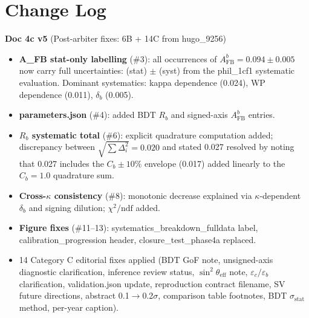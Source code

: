 \documentclass[11pt,a4paper]{article}
\begin{document}
\tableofcontents
\clearpage

\section*{Change Log}

\textbf{Doc 4c v5} (Post-arbiter fixes: 6B + 14C from hugo\_9256)
\begin{itemize}
\item \textbf{A\_FB stat-only labelling} (\#3): all occurrences of $A_\text{FB}^b = 0.094 \pm 0.005$
  now carry full uncertainties: (stat) $\pm$ (syst) from the phil\_1cf1 systematic evaluation.
  Dominant systematics: kappa dependence (0.024), WP dependence (0.011), $\delta_b$ (0.005).
\item \textbf{parameters.json} (\#4): added BDT $R_b$ and signed-axis $A_\text{FB}^b$ entries.
\item \textbf{$R_b$ systematic total} (\#6): explicit quadrature computation added;
  discrepancy between $\sqrt{\sum \Delta_i^2} = 0.020$ and stated 0.027 resolved
  by noting that 0.027 includes the $C_b \pm 10\%$ envelope (0.017) added linearly
  to the $C_b = 1.0$ quadrature sum.
\item \textbf{Cross-$\kappa$ consistency} (\#8): monotonic decrease explained via
  $\kappa$-dependent $\delta_b$ and signing dilution; $\chi^2/\text{ndf}$ added.
\item \textbf{Figure fixes} (\#11--13): systematics\_breakdown\_fulldata label,
  calibration\_progression header, closure\_test\_phase4a replaced.
\item 14 Category C editorial fixes applied (BDT GoF note, unsigned-axis diagnostic
  clarification, inference review status, $\sin^2\theta_\text{eff}$ note,
  $\varepsilon_c/\varepsilon_b$ clarification, validation.json update,
  reproduction contract filename, SV future directions, abstract 0.1$\to$0.2$\sigma$,
  comparison table footnotes, BDT $\sigma_\text{stat}$ method, per-year caption).
\end{itemize}
\end{document}
